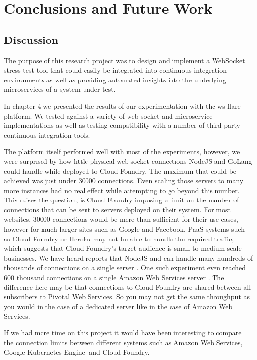 \chapter{Conclusions and Future Work}

\section{Discussion}

The purpose of this research project was to design and implement a WebSocket stress test tool that could easily be integrated into continuous integration environments as well as providing automated insights into the underlying microservices of a system under test.

In chapter 4 we presented the results of our experimentation with the ws-flare platform. We tested against a variety of web socket and microservice implementations as well as testing compatibility with a number of third party continuous integration tools. 

The platform itself performed well with most of the experiments, however, we were surprised by how little physical web socket connections NodeJS and GoLang could handle while deployed to Cloud Foundry. The maximum that could be achieved was just under 30000 connections. Even scaling those servers to many more instances had no real effect while attempting to go beyond this number. This raises the question, is Cloud Foundry imposing a limit on the number of connections that can be sent to servers deployed on their system. For most websites, 30000 connections would be more than sufficient for their use cases, however for much larger sites such as Google and Facebook, PaaS systems such as Cloud Foundry or Heroku may not be able to handle the required traffic, which suggests that Cloud Foundry's target audience is small to medium scale businesses. We have heard reports that NodeJS and can handle many hundreds of thousands of connections on a single server \cite{nodeConnections}. One such experiment even reached 600 thousand connections on a single Amazon Web Services server \cite{nodeConnections}. The difference here may be that connections to Cloud Foundry are shared between all subscribers to Pivotal Web Services. So you may not get the same throughput as you would in the case of a dedicated server like in the case of Amazon Web Services. 

If we had more time on this project it would have been interesting to compare the connection limits between different systems such as Amazon Web Services, Google Kubernetes Engine, and Cloud Foundry. 

